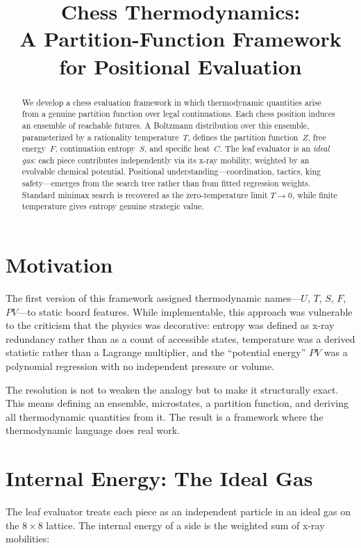 \documentclass[11pt,a4paper]{article}
\title{Chess Thermodynamics:\\A Partition-Function Framework for Positional Evaluation}
\author{}
\date{}
\begin{document}
\maketitle

\begin{abstract}
We develop a chess evaluation framework in which thermodynamic quantities
arise from a genuine partition function over legal continuations.
Each chess position induces an ensemble of reachable futures. A Boltzmann
distribution over this ensemble, parameterized by a rationality
temperature~$T$, defines the partition function~$Z$, free energy~$F$,
continuation entropy~$S$, and specific heat~$C$. The leaf evaluator
is an \emph{ideal gas}: each piece contributes independently via its
x-ray mobility, weighted by an evolvable chemical potential. Positional
understanding---coordination, tactics, king safety---emerges from the
search tree rather than from fitted regression weights. Standard minimax
search is recovered as the zero-temperature limit $T \to 0$, while finite
temperature gives entropy genuine strategic value.
\end{abstract}

\section{Motivation}

The first version of this framework assigned thermodynamic names---$U$,
$T$, $S$, $F$, $PV$---to static board features. While implementable, this
approach was vulnerable to the criticism that the physics was decorative:
entropy was defined as x-ray redundancy rather than as a count of
accessible states, temperature was a derived statistic rather than a
Lagrange multiplier, and the ``potential energy'' $PV$ was a polynomial
regression with no independent pressure or volume.

The resolution is not to weaken the analogy but to make it structurally
exact. This means defining an ensemble, microstates, a partition function,
and deriving all thermodynamic quantities from it. The result is a
framework where the thermodynamic language does real work.

\section{Internal Energy: The Ideal Gas}

The leaf evaluator treats each piece as an independent particle in an
ideal gas on the $8 \times 8$ lattice. The internal energy of a side is
the weighted sum of x-ray mobilities:
\end{document}
